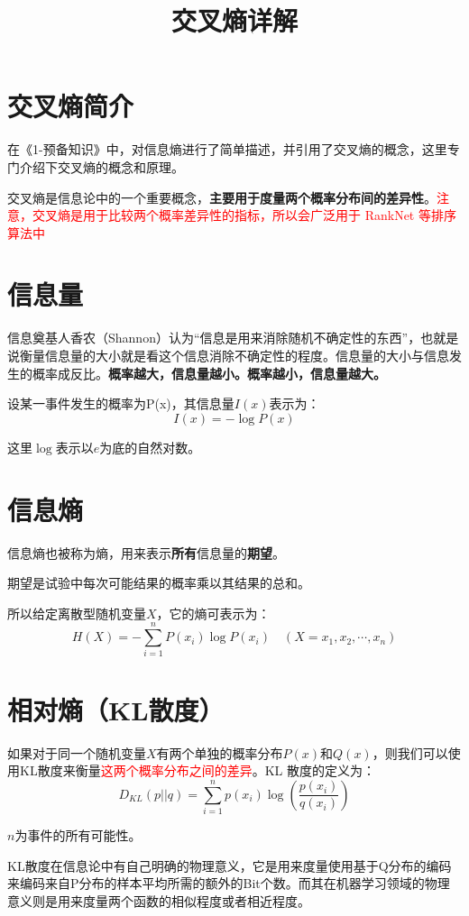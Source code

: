 \documentclass[12pt]{article}
\title{交叉熵详解\cite{CrossEntropy_Detail}}
\begin{document}
\section{交叉熵简介\cite{CrossEntropy_Detail}}
在《1-预备知识》中，对信息熵进行了简单描述，并引用了交叉熵的概念，这里专门介绍下交叉熵的概念和原理。

交叉熵是信息论中的一个重要概念，\textbf{主要用于度量两个概率分布间的差异性}。\textcolor{red}{注意，交叉熵是用于比较两个概率差异性的指标，所以会广泛用于 RankNet 等排序算法中}

\section{信息量}
信息奠基人香农（Shannon）认为“信息是用来消除随机不确定性的东西”，也就是说衡量信息量的大小就是看这个信息消除不确定性的程度。信息量的大小与信息发生的概率成反比。\textbf{概率越大，信息量越小。概率越小，信息量越大。}

设某一事件发生的概率为P(x)，其信息量$I(x)$表示为：
$$
I(x) = -\log{P(x)}
$$

这里$\log$表示以$e$为底的自然对数。

\section{信息熵}
信息熵也被称为熵，用来表示\textbf{所有}信息量的\textbf{期望}。

期望是试验中每次可能结果的概率乘以其结果的总和。

所以给定离散型随机变量$X$，它的熵可表示为：
$$
H(X) = -\sum_{i=1}^nP(x_i)\log{P(x_i)} \quad (X = x_1, x_2, \cdots, x_n)
$$

\section{相对熵（KL散度）}
如果对于同一个随机变量$X$有两个单独的概率分布$P(x)$和$Q(x)$，则我们可以使用KL散度来衡量\textcolor{red}{这两个概率分布之间的差异}。KL 散度的定义为：
$$
D_{KL}(p||q) = \sum_{i=1}^np(x_i)\log{(\frac{p(x_i)}{q(x_i)})}
$$

$n$为事件的所有可能性。

KL散度在信息论中有自己明确的物理意义，它是用来度量使用基于Q分布的编码来编码来自P分布的样本平均所需的额外的Bit个数。而其在机器学习领域的物理意义则是用来度量两个函数的相似程度或者相近程度。
\end{document}
